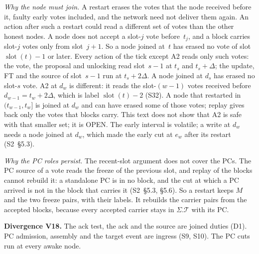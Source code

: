 \documentclass{article}
\newcommand{\slot}{\operatorname{slot}}
\newcommand{\T}{\mathcal T}
\newcommand{\PCdiv}[2]{\par\noindent\textbf{Divergence #1.} #2\par}
\begin{document}
\emph{Why the node must join.}  A restart erases the votes that the node
received before it, faulty early votes included, and the network need not
deliver them again.  An action after such a restart could read a different
set of votes than the other honest nodes.  A node does not accept a
slot-$j$ vote before~$t_j$, and a block carries slot-$j$ votes only from
slot~$j+1$.  So a node joined at~$t$ has erased no vote of slot
$\slot(t)-1$ or later.  Every action of the tick except A2 reads only
such votes: the vote, the proposal and unlocking read slot~$s-1$ at $t_s$
and $t_s+\Delta$; the update, FT and the source of slot~$s-1$ run at
$t_s+2\Delta$.  A node joined at $d_s$ has erased no slot-$s$ vote.  A2 at
$d_w$ is different: it reads the slot-$(w-1)$ votes received before
$d_{w-1}=t_w+2\Delta$, which is label $\slot(t)-2$ (S32).  A node that
restarted in $(t_{w-1},t_w]$ is joined at $d_w$ and can have erased some
of those votes; replay gives back only the votes that blocks carry.  This
text does not show that A2 is safe with that smaller set; it is OPEN.  The
early interval is volatile; a write at $d_w$ needs a node joined at $d_w$,
which made the early cut at $e_w$ after its restart (S2~\S5.3).

\emph{Why the PC roles persist.}  The recent-slot argument does not cover
the PCs.  The PC source of a vote reads the freeze of the previous slot,
and replay of the blocks cannot rebuild it: a standalone PC is in no
block, and the cut at which a PC arrived is not in the block that carries
it (S2~\S5.3, \S5.6).  So a restart keeps $M$ and the two freeze pairs, with
their labels.  It rebuilds the carrier pairs from the accepted blocks,
because every accepted carrier stays in $\Sigma.\T$ with its PC.

\PCdiv{V18}{The ack test, the ack and the source are joined duties (D1).
PC admission, assembly and the target event are ingress (S9, S10).  The PC
cuts run at every awake node.}
\end{document}
